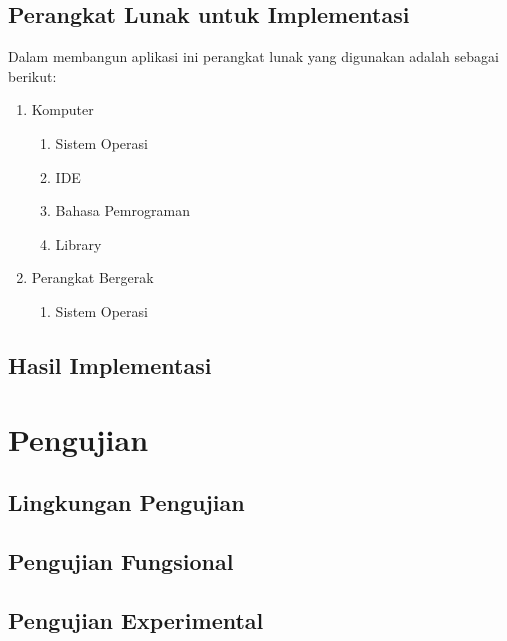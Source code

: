 \subsection{Perangkat Lunak untuk Implementasi}
\label{lab:Perangkat Lunak untuk Implementasi}
\hspace{0.5cm} Dalam membangun aplikasi ini perangkat lunak yang digunakan adalah sebagai berikut:
\begin{enumerate}
	\item Komputer
		\begin{enumerate}
			\item Sistem Operasi
			\item IDE
			\item Bahasa Pemrograman
			\item Library
		\end{enumerate}
		
	\item Perangkat Bergerak
		\begin{enumerate}
			\item Sistem Operasi
		\end{enumerate}
\end{enumerate}

\subsection{Hasil Implementasi}
\label{lab:Hasil Implementasi}

\section{Pengujian}
\label{lab:Pengujian}
\hspace{0.5cm} 

\subsection{Lingkungan Pengujian}
\label{lab:Lingkungan Pengujian}

\subsection{Pengujian Fungsional}
\label{lab:Pengujian Fungsional}

\subsection{Pengujian Experimental}
\label{lab:Pengujian Experimental}